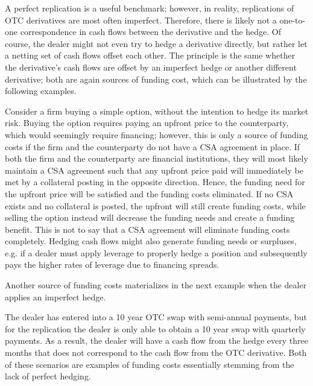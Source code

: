 \documentclass[main.tex]{subfiles}
\begin{document}
        A perfect replication is a useful benchmark;
        however, in reality, replications of OTC derivatives are most often imperfect.
        Therefore, there is likely not a one-to-one correspondence 
        in cash flows between the derivative and the hedge.
        Of course, the dealer might not even try to hedge a derivative directly,
        but rather let a netting set of cash flows offset each other. 
        The principle is the same whether the derivative's cash flows are offset by an imperfect hedge
        or another different derivative;
        both are again sources of funding cost, which can be illustrated by the following examples.

        \begin{example}
        Consider a firm buying a simple option, without the intention to hedge its market risk.
        Buying the option requires paying an upfront price to the counterparty,
        which would seemingly require financing;
        however, this is only a source of funding costs 
        if the firm and the counterparty do not have a CSA agreement in place.
        If both the firm and the counterparty are financial institutions, 
        they will most likely maintain a CSA agreement
        such that any upfront price paid will immediately be met by a collateral posting in the opposite direction.
        Hence, the funding need for the upfront price will be satisfied and the funding costs eliminated.
        If no CSA exists and no collateral is posted, the upfront will still create funding costs,
        while selling the option instead will decrease the funding needs and create a funding benefit.
        This is not to say that a CSA agreement will eliminate funding costs completely. 
        Hedging cash flows might also generate funding needs or surpluses, 
        e.g. if a dealer must apply leverage to properly hedge a position 
        and subsequently pays the higher rates of leverage due to financing spreads.
        \end{example}

        Another source of funding costs materializes in the next example when the dealer applies an imperfect hedge.
        
        \begin{example}
        The dealer has entered into a 10 year OTC swap with semi-annual payments, 
        but for the replication the dealer is only able to obtain a 10 year swap with quarterly payments.
        As a result, the dealer will have a cash flow from the hedge every three months
        that does not correspond to the cash flow from the OTC derivative. 
        Both of these scenarios are examples of funding costs essentially stemming from the lack of perfect hedging.
        \end{example}
\end{document}

